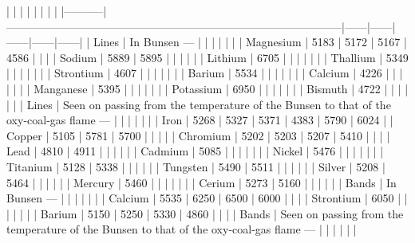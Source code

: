 \documentclass[a4paper, 12pt, oneside, polutonikogreek, english]{article}
\begin{document}
|      |                                             |   |   |   |   |   |
|-----------|------------------------------------------------------------------------------------------|------|------|------|------|------|
| Lines   | In Bunsen ---                                      |   |   |   |   |   |
| Magnesium | 5183                                           | 5172 | 5167 | 4586 |   |   |
| Sodium  | 5889                                           | 5895 |   |   |   |   |
| Lithium  | 6705                                           |   |   |   |   |   |
| Thallium | 5349                                           |   |   |   |   |   |
| Strontium | 4607                                           |   |   |   |   |   |
| Barium  | 5534                                           |   |   |   |   |   |
| Calcium  | 4226                                           |   |   |   |   |   |
| Manganese | 5395                                           |   |   |   |   |   |
| Potassium | 6950                                           |   |   |   |   |   |
| Bismuth  | 4722                                           |   |   |   |   |   |
| Lines   | Seen on passing from the temperature of the Bunsen to that of the oxy-coal-gas flame --- |   |   |   |   |   |
| Iron   | 5268                                           | 5327 | 5371 | 4383 | 5790 | 6024 |
| Copper  | 5105                                           | 5781 | 5700 |   |   |   |
| Chromium | 5202                                           | 5203 | 5207 | 5410 |   |   |
| Lead   | 4810                                           | 4911 |   |   |   |   |
| Cadmium  | 5085                                           |   |   |   |   |   |
| Nickel  | 5476                                           |   |   |   |   |   |
| Titanium | 5128                                           | 5338 |   |   |   |   |
| Tungsten | 5490                                           | 5511 |   |   |   |   |
| Silver  | 5208                                           | 5464 |   |   |   |   |
| Mercury  | 5460                                           |   |   |   |   |   |
| Cerium  | 5273                                           | 5160 |   |   |   |   |
| Bands   | In Bunsen ---                                      |   |   |   |   |   |
| Calcium  | 5535                                           | 6250 | 6500 | 6000 |   |   |
| Strontium | 6050                                           |   |   |   |   |   |
| Barium  | 5150                                           | 5250 | 5330 | 4860 |   |   |
| Bands   | Seen on passing from the temperature of the Bunsen to that of the oxy-coal-gas flame --- |   |   |   |   |   |
\end{document}
